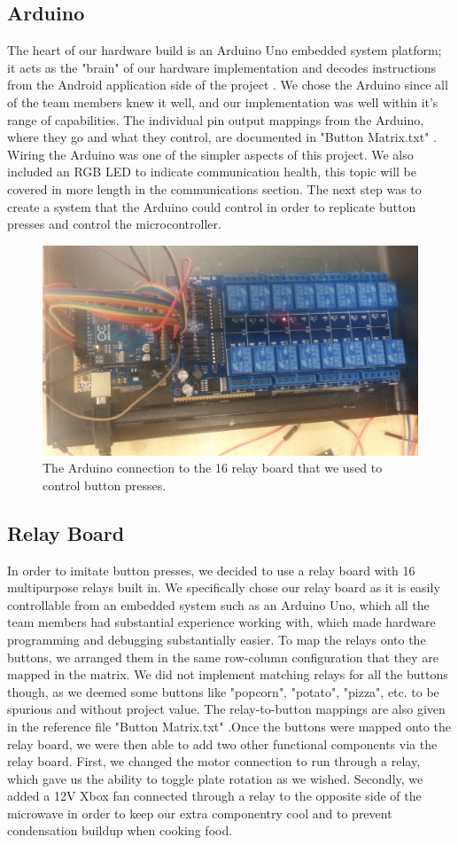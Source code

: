 \documentclass[10pt,journal,letterpaper,twocolumn]{IEEEtran}
\begin{document}
\subsection*{Arduino}

The heart of our hardware build is an Arduino Uno embedded system platform; it acts as the "brain" of our hardware implementation and decodes instructions from the Android application side of the project \cite{raspberryPicrowaveRepo}.  We chose the Arduino since all of the team members knew it well, and our implementation was well within it's range of capabilities.   The individual pin output mappings from the Arduino, where they go and what they control, are documented in "Button Matrix.txt" \cite{gitHubRepo}.  Wiring the Arduino was one of the simpler aspects of this project.  We also included an RGB LED to indicate communication health, this topic will be covered in more length in the communications section.  The next step was to create a system that the Arduino could control in order to replicate button presses and control the microcontroller.

\begin{figure}[ht]
\centering
\includegraphics[width=.5\textwidth]{Arduino_and_Relay_Board.jpg}
\caption{\label{fig:relay}The Arduino connection to the 16 relay board that we used to control button presses.}
\end{figure}

\subsection*{Relay Board}

In order to imitate button presses, we decided to use a relay board with 16 multipurpose relays built in.  We specifically chose our relay board as it is easily controllable from an embedded system such as an Arduino Uno, which all the team members had substantial experience working with, which made hardware programming and debugging substantially easier.  To map the relays onto the buttons, we arranged them in the same row-column configuration that they are mapped in the matrix.  We did not implement matching relays for all the buttons though, as we deemed some buttons like "popcorn", "potato", "pizza", etc. to be spurious and without project value.  The relay-to-button mappings are also given in the reference file "Button Matrix.txt" \cite{gitHubRepo}.Once the buttons were mapped onto the relay board, we were then able to add two other functional components via the relay board.  First, we changed the motor connection to run through a relay, which gave us the ability to toggle plate rotation as we wished.  Secondly, we added a 12V Xbox fan connected through a relay to the opposite side of the microwave in order to keep our extra componentry cool and to prevent condensation buildup when cooking food.
\end{document}
